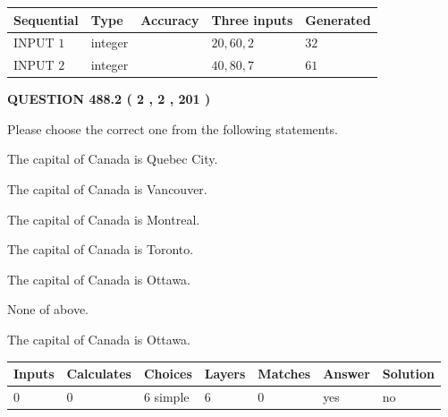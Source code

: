 \documentclass[12pt]{article}
\begin{document}
  
\noindent\begin{tabular}{|l|l|l|l|l|}
\hline
 Sequential & Type & Accuracy & Three inputs & Generated \\ 
\hline
 
 
  INPUT $  1 $ & integer &  & $
 20
 , 
 60
 , 
 2
 $ & $ 32 $ 
 \\  \hline  
 
 
  INPUT $  2 $ & integer &  & $
 40
 , 
 80
 , 
 7
 $ & $ 61 $ 
 \\  \hline  
 \end{tabular}
   
   
  
\vspace{0.2in}
  
{\textbf{\Large{QUESTION
488.2 
 ( 2 , 2 , 201 )
}}}
  
  
Please choose the correct one from the following statements.
 
 
The capital of Canada is Quebec City.
 
 
The capital of Canada is Vancouver.
 
 
The capital of Canada is Montreal.
 
 
The capital of Canada is Toronto.
 
 
The capital of Canada is Ottawa.
 
 
 None of above.
 
 
\noindent{}
 
 
The capital of Canada is Ottawa.
 
 
\noindent{}
 
 
   
   
   
   
\noindent\begin{tabular}{|l|l|l|l|l|l|l|}
 \hline
Inputs & Calculates & Choices & Layers & Matches & Answer & Solution \\ \hline
 0  & 
 0  & 
 6
  simple  
  & 
 6  & 
 0  & 
  yes & 
  no 
  \\ \hline
 \end{tabular}
   
   
   
\end{document}
